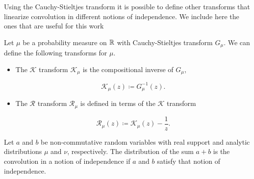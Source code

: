     Using the Cauchy-Stieltjes transform it is possible to define other transforms that linearize convolution in different notions of independence. We include here the ones that are useful for this work

    \begin{definition}
        Let $\mu$ be a probability measure on $\mathbb R$ with Cauchy-Stieltjes transform $G_\mu$. We can define the following transforms for $\mu$.

        \begin{itemize}
            \item The $\mathcal K$ transform $\mathcal K_\mu$ is the compositional inverse of $G_\mu$,
            
                \[ \mathcal K_\mu (z) \coloneqq G_\mu^{-1}(z). \]

            
            
            \item The $\mathcal R$ transform $\mathcal R_\mu$ is defined in terms of the $\mathcal K$ transform

                \[ \mathcal R_\mu(z) \coloneqq \mathcal K_\mu(z) - \frac1z. \]

            

            
        \end{itemize}
    \end{definition}

    Let $a$ and $b$ be non-commutative random variables with real support and analytic distributions $\mu$ and $\nu$, respectively. The distribution of the sum $a+b$ is the convolution in a notion of independence if $a$ and $b$ satisfy that notion of independence.

